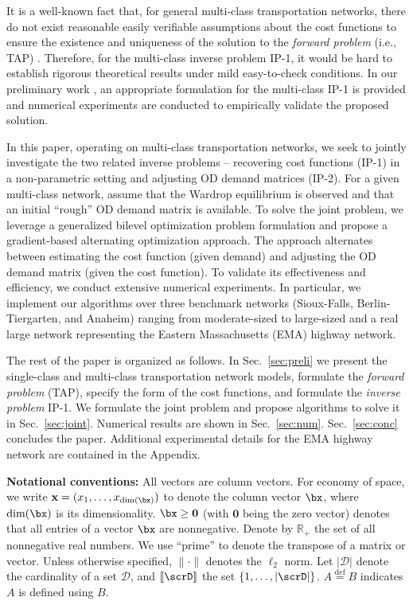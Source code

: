 \documentclass[3p]{elsarticle}
\newcommand*{\defeq}{\stackrel{\text{def}}{=}}
\begin{document}
It is a well-known fact that, for general multi-class transportation
networks, there do not exist reasonable easily verifiable assumptions
about the cost functions to ensure the existence and uniqueness of the
solution to the \emph{forward problem} (i.e., TAP)
\cite{noriega2007algorithmic}. Therefore, for the multi-class inverse
problem IP-1, it would be hard to establish rigorous theoretical results
under mild easy-to-check conditions. In our preliminary work
\cite{CDC17}, an appropriate formulation for the multi-class IP-1 is
provided and numerical experiments are conducted to empirically validate
the proposed solution.

In this paper, operating on multi-class transportation networks, we seek
to jointly investigate the two related inverse problems -- recovering
cost functions (IP-1) in a non-parametric setting and adjusting OD
demand matrices (IP-2). For a given multi-class network, assume that the
Wardrop equilibrium is observed and that an initial ``rough'' OD demand
matrix is available. To solve the joint problem, we leverage a
generalized bilevel optimization problem formulation and propose a
gradient-based alternating optimization approach. The approach
alternates between estimating the cost function (given demand) and
adjusting the OD demand matrix (given the cost function). To validate
its effectiveness and efficiency, we conduct extensive numerical
experiments. In particular, we implement our algorithms over three
benchmark networks (Sioux-Falls, Berlin-Tiergarten, and Anaheim) ranging
from moderate-sized to large-sized and a real large network representing
the Eastern Massachusetts (EMA) highway network.

The rest of the paper is organized as follows. In Sec.~\ref{sec:preli}
we present the single-class and multi-class transportation network
models, formulate the \emph{forward problem} (TAP), specify the form of
the cost functions, and formulate the \emph{inverse problem} IP-1. We
formulate the joint problem and propose algorithms to solve it in
Sec.~\ref{sec:joint}. Numerical results are shown in
Sec.~\ref{sec:num}. Sec.~\ref{sec:conc} concludes the paper. Additional
experimental details for the EMA highway network are contained in the
Appendix.
	
	
\textbf{Notational conventions:} All vectors are column vectors. For
economy of space, we write $\mathbf x = (x_1, \ldots,
x_{\text{dim}(\bx)})$ to denote the column vector $\bx$, where
$\text{dim}(\bx)$ is its dimensionality. $\bx \ge \textbf{0}$ (with
$\textbf{0}$ being the zero vector) denotes that all entries of a vector
$\bx$ are nonnegative. Denote by $\mathbb{R}_+$ the set of all
nonnegative real numbers. We use ``prime'' to denote the transpose of a
matrix or vector. Unless otherwise specified, $\|\cdot\|$ denotes the
$\ell_2$ norm. Let $\left| \mathcal{D} \right|$ denote the cardinality
of a set $\mathcal{D}$, and $\left[\kern-0.15em\left[ \scrD
  \right]\kern-0.15em\right]$ the set $\left\{ {1, \ldots ,\left| \scrD
    \right|} \right\}$. $A \defeq B$ indicates $A$ is defined using $B$.
	
\end{document}
